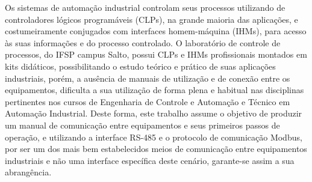 Os sistemas de automação industrial controlam seus processos utilizando de controladores lógicos programáveis (CLPs), na grande maioria das aplicações, e costumeiramente conjugados com interfaces homem-máquina (IHMs), para acesso às suas informações e do processo controlado.
O laboratório de controle de processos, do IFSP campus Salto, possui CLPs e IHMs profissionais montados em kits didáticos, possibilitando o estudo teórico e prático de suas aplicações industriais, porém, 
a ausência de manuais de utilização e de conexão entre os equipamentos, dificulta a sua utilização de forma plena e habitual nas disciplinas pertinentes nos cursos de Engenharia de Controle e Automação e Técnico em Automação Industrial.
Deste forma, este trabalho assume o objetivo de produzir um manual de comunicação entre equipamentos e seus primeiros passos de operação, e 
utilizando a interface RS-485 e o protocolo  de comunicação Modbus, por ser um dos mais bem estabelecidos meios de comunicação entre equipamentos industriais e não uma interface específica deste cenário, garante-se assim a sua abrangência. 



